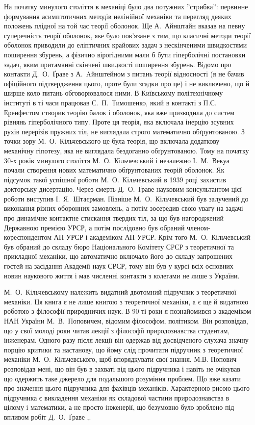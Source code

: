\documentclass[11pt, reqno]{amsart}
\begin{document}
На початку минулого століття в механіці було два потужних ''стрибка'': первинне формування асимптотичних методів нелінійної механіки та перегляд деяких положень плідної на той час теорії оболонок. Ще А.~Айнштайн вказав на певну суперечність теорії оболонок, яке було пов'язане з тим, що класичні методи теорії оболонок приводили до еліптичних крайових задач з нескінченими швидкостями поширення збурень, а фізично вірогідними мали б бути гіперболічні постановки задач, яким притаманні скінчені швидкості поширення збурень. Відомо про контакти Д.~О.~Ґраве з А.~Aйнштейном з питань теорії відносності (я не бачив офіційного підтвердження цього, проте були згадки про це) і не виключено, що й ширше коло питань обговорювалося ними. В Київському політехнічному інституті в ті часи працював С.~П.~Тимошенко, який в контакті з П.С. Еренфестом створив теорію балок і оболонок, яка вже призводила до систем рівнянь гіперболічного типу. Проте ця теорія, яка включала інерцію зсувних рухів перерізів пружних тіл, не виглядала строго математично обґрунтованою. З точки зору М.~О.~Кільчевського це була теорія, що включала додаткову механічну гіпотезу, яка не виглядала бездоганно обґрунтованою. Тому на початку 30-х років минулого століття М.~О.~Кільчевський і незалежно І.~М.~Векуа почали створення нових математично обґрунтованих теорій оболонок. Як підсумок такої успішної роботи М.~О.~Кільчевський в 1939 році захистив докторську дисертацію. Через смерть Д.~О.~Ґраве науковим консультантом цієї роботи виступив І.~Я.~Штаєрман. Пізніше М.~О.~Кільчевський був залучений до виконання різних оборонних замовлень, а потім зосередив свою увагу на задачі про динамічне контактне стискання твердих тіл, за що був нагороджений Державною премією УРСР, а потім послідовно був обраний членом-кореспондентом АН УРСР і академіком АН УРСР. Крім того М.~О.~Кільчевський був обраний до складу бюро Національного Комітету СРСР з теоретичної та прикладної механіки, що автоматично включало його до складу запрошених гостей на засідання Академії наук СРСР, тому він був у курсі всіх основних новин наукового життя і мав численні контакти з колегами не лише з України.

М.~О.~Кільчевському належить видатний двотомний підручник з теоретичної механіки. Ця книга є не лише книгою з теоретичної механіки, а є ще й видатною роботою з філософії природничих наук. В 90-ті роки я познайомився з академіком НАН України М.~В.~Поповичем, відомим філософом, політиком. Він розповідав, що у свої молоді роки читав лекції з філософії природознавства студентам, інженерам. Одного разу після лекції він одержав від досвідченого слухача значну порцію критики та настанову, що йому слід прочитати підручник з теоретичної механіки М.~О.~Кільчевського, щоб впорядкувати свої знання. М.В. Попович розповідав мені, що він був в захваті від цього підручника і навіть не очікував що одержить таке джерело для подальшого розуміння проблем. Що вже казати про значення цього підручника для фахівців-механіків. Характерною рисою цього підручника є викладення механіки як складової частини природознавства в цілому і математики, а не просто інженерії, що безумовно було зроблено під впливом робіт Д.~О.~Ґраве \cite{G081},\cite{G30}.
\end{document}
